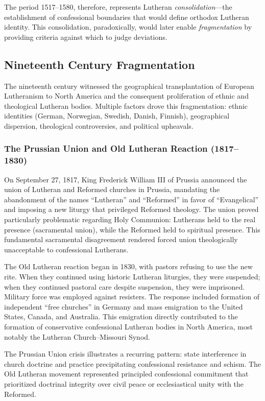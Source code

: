 The period 1517--1580, therefore, represents Lutheran \textit{consolidation}---the establishment of confessional boundaries that would define orthodox Lutheran identity. This consolidation, paradoxically, would later enable \textit{fragmentation} by providing criteria against which to judge deviations.

\subsection{Nineteenth Century Fragmentation}

The nineteenth century witnessed the geographical transplantation of European Lutheranism to North America and the consequent proliferation of ethnic and theological Lutheran bodies. Multiple factors drove this fragmentation: ethnic identities (German, Norwegian, Swedish, Danish, Finnish), geographical dispersion, theological controversies, and political upheavals.

\subsubsection{The Prussian Union and Old Lutheran Reaction (1817--1830)}

On September 27, 1817, King Frederick William III of Prussia announced the union of Lutheran and Reformed churches in Prussia, mandating the abandonment of the names ``Lutheran'' and ``Reformed'' in favor of ``Evangelical'' and imposing a new liturgy that privileged Reformed theology. The union proved particularly problematic regarding Holy Communion: Lutherans held to the real presence (sacramental union), while the Reformed held to spiritual presence. This fundamental sacramental disagreement rendered forced union theologically unacceptable to confessional Lutherans.

The Old Lutheran reaction began in 1830, with pastors refusing to use the new rite. When they continued using historic Lutheran liturgies, they were suspended; when they continued pastoral care despite suspension, they were imprisoned. Military force was employed against resisters. The response included formation of independent ``free churches'' in Germany and mass emigration to the United States, Canada, and Australia. This emigration directly contributed to the formation of conservative confessional Lutheran bodies in North America, most notably the Lutheran Church--Missouri Synod.

The Prussian Union crisis illustrates a recurring pattern: state interference in church doctrine and practice precipitating confessional resistance and schism. The Old Lutheran movement represented principled confessional commitment that prioritized doctrinal integrity over civil peace or ecclesiastical unity with the Reformed.

